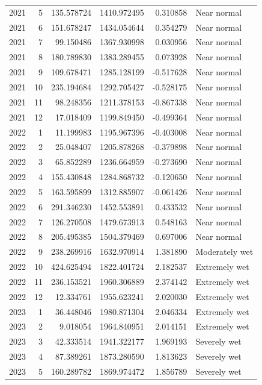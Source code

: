 \begin{tabular}{rrrrrl}
2021 & 5 & 135.578724 & 1410.972495 & 0.310858 & Near normal \\
2021 & 6 & 151.678247 & 1434.054644 & 0.354279 & Near normal \\
2021 & 7 & 99.150486 & 1367.930998 & 0.030956 & Near normal \\
2021 & 8 & 180.789830 & 1383.289455 & 0.073928 & Near normal \\
2021 & 9 & 109.678471 & 1285.128199 & -0.517628 & Near normal \\
2021 & 10 & 235.194684 & 1292.705427 & -0.528175 & Near normal \\
2021 & 11 & 98.248356 & 1211.378153 & -0.867338 & Near normal \\
2021 & 12 & 17.018409 & 1199.849450 & -0.499364 & Near normal \\
2022 & 1 & 11.199983 & 1195.967396 & -0.403008 & Near normal \\
2022 & 2 & 25.048407 & 1205.878268 & -0.379898 & Near normal \\
2022 & 3 & 65.852289 & 1236.664959 & -0.273690 & Near normal \\
2022 & 4 & 155.430848 & 1284.868732 & -0.120650 & Near normal \\
2022 & 5 & 163.595899 & 1312.885907 & -0.061426 & Near normal \\
2022 & 6 & 291.346230 & 1452.553891 & 0.433532 & Near normal \\
2022 & 7 & 126.270508 & 1479.673913 & 0.548163 & Near normal \\
2022 & 8 & 205.495385 & 1504.379469 & 0.697006 & Near normal \\
2022 & 9 & 238.269916 & 1632.970914 & 1.381890 & Moderately wet \\
2022 & 10 & 424.625494 & 1822.401724 & 2.182537 & Extremely wet \\
2022 & 11 & 236.153521 & 1960.306889 & 2.374142 & Extremely wet \\
2022 & 12 & 12.334761 & 1955.623241 & 2.020030 & Extremely wet \\
2023 & 1 & 36.448046 & 1980.871304 & 2.046334 & Extremely wet \\
2023 & 2 & 9.018054 & 1964.840951 & 2.014151 & Extremely wet \\
2023 & 3 & 42.333514 & 1941.322177 & 1.969193 & Severely wet \\
2023 & 4 & 87.389261 & 1873.280590 & 1.813623 & Severely wet \\
2023 & 5 & 160.289782 & 1869.974472 & 1.856789 & Severely wet \\

\end{tabular}
